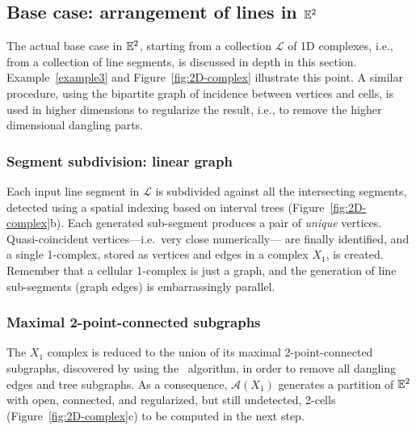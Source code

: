 %
%


\subsection{{Base case}: arrangement of lines in $\mathbb{E}^2$}
\label{sec:basic-step}

The actual {base} case in $\mathbb{E}^2$, starting from a collection $\mathcal{L}$ of 1D complexes, i.e., from a collection of line segments, is discussed in depth in this section. Example~\ref{example3} and Figure~\ref{fig:2D-complex} illustrate this point.
{A similar procedure, using the bipartite graph of incidence between vertices and cells, is used in higher dimensions to regularize the result, i.e., to remove the higher dimensional dangling parts.}

\subsubsection{Segment {subdivision}: linear graph}

Each input line segment in $\mathcal{L}$ is {subdivided} against all the intersecting segments, detected using a spatial indexing based on interval trees (Figure~\ref{fig:2D-complex}b). Each generated sub-segment produces a pair of \emph{unique} vertices. Quasi-coincident vertices---i.e.~very close numerically--- are finally identified, and a single 1-complex, stored as vertices and edges in a complex $X_1$, is created. {Remember that a cellular 1-complex is just a graph, and} the generation of {line sub-segments (graph edges)} is embarrassingly parallel.

\subsubsection{Maximal 2-point-connected subgraphs}
\label{sec:jeh}

The $X_1$ complex is reduced to the union of its maximal 2-point-connected subgraphs, discovered by using the~\cite{Hopcroft:1973:AEA:362248.362272} algorithm, in order to remove all dangling edges and tree subgraphs. As a consequence, $\mathcal{A}(X_1)$ generates a partition of $\mathbb{E}^2$ with open, connected, and regularized, but still undetected, 2-cells (Figure~\ref{fig:2D-complex}c) to be computed in the next step.

